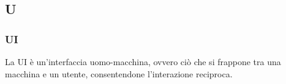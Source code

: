\subsection*{\textbf{\hfill \Huge{U} \hfill}} 
\subsubsection*{UI}
La UI è un'interfaccia uomo-macchina, ovvero ciò che si frappone tra una macchina e un utente, consentendone l'interazione reciproca.